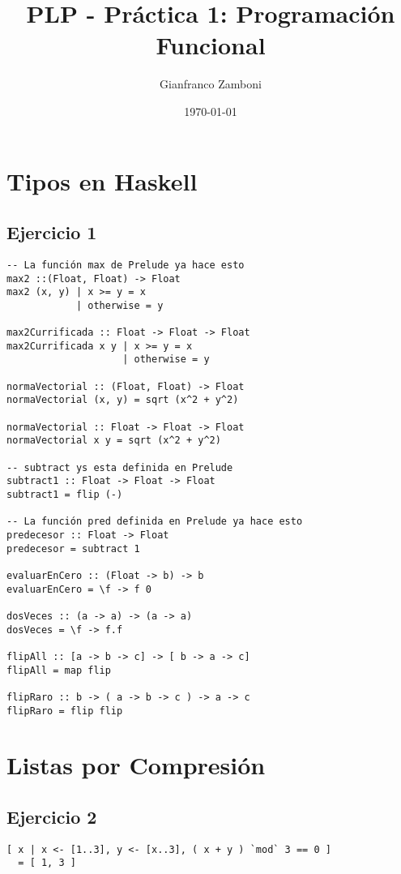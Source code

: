 \documentclass[10pt,a4paper]{article}
\begin{document}
\title{PLP - Práctica 1: Programación Funcional}

\date{\today}

\author{Gianfranco Zamboni}

\maketitle
\setcounter{page}{1}

\section*{Tipos en Haskell}
\subsection{Ejercicio 1}
\begin{centrado}
\begin{verbatim}
-- La función max de Prelude ya hace esto
max2 ::(Float, Float) -> Float
max2 (x, y) | x >= y = x        
            | otherwise = y

max2Currificada :: Float -> Float -> Float
max2Currificada x y | x >= y = x
                    | otherwise = y

normaVectorial :: (Float, Float) -> Float
normaVectorial (x, y) = sqrt (x^2 + y^2)

normaVectorial :: Float -> Float -> Float
normaVectorial x y = sqrt (x^2 + y^2)

-- subtract ys esta definida en Prelude
subtract1 :: Float -> Float -> Float  
subtract1 = flip (-)

-- La función pred definida en Prelude ya hace esto
predecesor :: Float -> Float  
predecesor = subtract 1

evaluarEnCero :: (Float -> b) -> b
evaluarEnCero = \f -> f 0

dosVeces :: (a -> a) -> (a -> a)
dosVeces = \f -> f.f

flipAll :: [a -> b -> c] -> [ b -> a -> c]
flipAll = map flip

flipRaro :: b -> ( a -> b -> c ) -> a -> c
flipRaro = flip flip
\end{verbatim}
\end{centrado}

\section*{Listas por Compresión}
\subsection{Ejercicio 2}
\begin{centrado}
\begin{verbatim}
[ x | x <- [1..3], y <- [x..3], ( x + y ) `mod` 3 == 0 ] 
  = [ 1, 3 ]
\end{verbatim}
\end{centrado}
\end{document}
